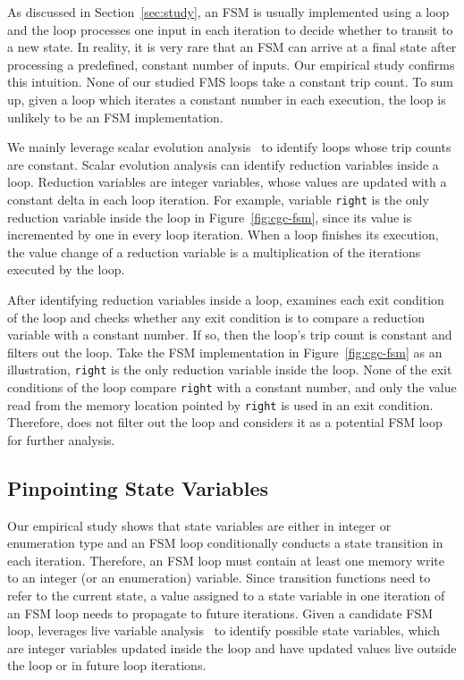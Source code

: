 As discussed in Section~\ref{sec:study},
an FSM is usually implemented using a loop 
and the loop processes one input in each iteration to decide 
whether to transit to a new state. 
In reality, it is very rare that an FSM can arrive at a final state 
after processing a predefined, constant number of inputs.
Our empirical study confirms this intuition. 
None of our studied FMS loops take a constant trip count.  
To sum up, given a loop which iterates a constant 
number in each execution, 
the loop is unlikely to be an FSM implementation. 

We mainly leverage scalar evolution analysis~\cite{scalar-1,scalar-2,scalar-3} 
to identify loops whose trip counts are constant. 
Scalar evolution analysis can identify reduction variables inside a loop.
Reduction variables are integer variables, 
whose values are updated 
with a constant delta in each loop iteration. 
For example, variable \texttt{right} is the only reduction 
variable inside the loop in Figure~\ref{fig:cgc-fsm}, 
since its value is incremented by one in every loop iteration.  
When a loop finishes its execution, the value change of a 
reduction variable is a multiplication of 
the iterations executed by the loop. 

After identifying reduction variables inside a loop,
\Tool{} examines each exit condition of the loop and checks whether 
any exit condition is to compare 
a reduction variable with a constant number. 
If so, then the loop's trip count is constant and \Tool{} filters out the loop. 
Take the FSM implementation in Figure~\ref{fig:cgc-fsm} as an illustration, 
\texttt{right} is the only reduction variable inside the loop.
None of the exit conditions of the loop compare \texttt{right} with a constant number,
and only the value read from the memory location pointed by \texttt{right} is used 
in an exit condition. 
Therefore, \Tool{} does not filter out the loop and considers it 
as a potential FSM loop for further analysis. 




\subsection{Pinpointing State Variables}
\label{sec:variable}

Our empirical study shows that state variables are either in integer or enumeration type
and an FSM loop conditionally conducts a state transition in each iteration. 
Therefore, an FSM loop must contain at least one memory write to an integer 
(or an enumeration) variable. 
Since transition functions need to refer to the current state, 
a value assigned to a state variable in one iteration of an FSM loop needs 
to propagate to future iterations.
Given a candidate FSM loop, 
\Tool{} leverages live variable 
analysis~\cite{live-analysis} to 
identify possible state variables, which are integer variables 
updated inside the loop and have updated values live outside the loop 
or in future loop iterations. 

